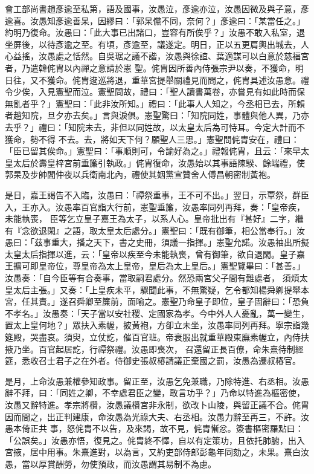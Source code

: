 \begin{pinyinscope}
 會工部尚書趙彥逾至私第，語及國事，汝愚泣，彥逾亦泣，汝愚因微及與子意，彥逾喜。汝愚知彥逾善杲，因繆曰：「郭杲儻不同，奈何？」彥逾曰：「某當任之。」約明乃復命。汝愚曰：「此大事已出諸口，豈容有所俟乎？」汝愚不敢入私室，退坐屏後，以待彥逾之至。有頃，彥逾至，議遂定。明日，正以五更肩輿出城去，人心益搖，汝愚處之恬然。自吳琚之議不諧，汝愚與徐誼、葉適謀可以白意於慈福宮者，乃遣韓侂胄以內禪之意請於憲
 聖。侂胄因所善內侍張宗尹以奏，不獲命，明日往，又不獲命。侂胄逡巡將退，重華宮提舉關禮見而問之，侂胄具述汝愚意。禮令少俟，入見憲聖而泣。憲聖問故，禮曰：「聖人讀書萬卷，亦嘗見有如此時而保無亂者乎？」憲聖曰：「此非汝所知。」禮曰：「此事人人知之，今丞相已去，所賴者趙知院，旦夕亦去矣。」言與淚俱。憲聖驚曰：「知院同姓，事體與他人異，乃亦去乎？」禮曰：「知院未去，非但以同姓故，以太皇太后為可恃耳。今定大計而不獲命，勢不得
 不去。去，將如天下何？願聖人三思。」憲聖問侂胄安在，禮曰：「臣已留其俟命。」憲聖曰：「事順則可，令諭好為之。」禮報侂胄，且云：「來早太皇太后於壽皇梓宮前垂簾引執政。」侂胄復命，汝愚始以其事語陳騤、餘端禮，使郭杲及步帥閻仲夜以兵衛南北內，禮使其姻黨宣贊舍人傅昌朝密制黃袍。



 是日，嘉王謁告不入臨，汝愚曰：「禫祭重事，王不可不出。」翌日，示覃祭，群臣入，王亦入。汝愚率百官詣大行前，憲聖垂簾，汝愚率同列再拜，奏：「皇帝疾，未能執喪，
 臣等乞立皇子嘉王為太子，以系人心。皇帝批出有『甚好』二字，繼有『念欲退閑』之語，取太皇太后處分。」憲聖曰：「既有御筆，相公當奉行。」汝愚曰：「茲事重大，播之天下，書之史冊，須議一指揮。」憲聖允諾。汝愚袖出所擬太皇太后指揮以進，云：「皇帝以疾至今未能執喪，曾有御筆，欲自退閑。皇子嘉王擴可即皇帝位，尊皇帝為太上皇帝，皇后為太上皇后。」憲聖覽畢曰：「甚善。」汝愚奏：「自今臣等有合奏事，當取嗣君處分。然恐兩宮父子間有難處者，
 須煩太皇太后主張。」又奏：「上皇疾未平，驟聞此事，不無驚疑，乞令都知楊舜卿提舉本宮，任其責。」遂召舜卿至簾前，面喻之。憲聖乃命皇子即位，皇子固辭曰：「恐負不孝名。」汝愚奏：「天子當以安社稷、定國家為孝。今中外人人憂亂，萬一變生，置太上皇何地？」眾扶入素幄，披黃袍，方卻立未坐，汝愚率同列再拜。寧宗詣幾筵殿，哭盡哀。須臾，立仗訖，催百官班。帝衰服出就重華殿東廡素幄立，內侍扶掖乃坐。百官起居訖，行禫祭禮。汝愚即喪次，
 召還留正長百僚，命朱熹待制經筵，悉收召士君子之在外者。侍御史張叔椿請議正棄國之罰，汝愚為遷叔椿官。



 是月，上命汝愚兼權參知政事。留正至，汝愚乞免兼職，乃除特進、右丞相。汝愚辭不拜，曰：「同姓之卿，不幸處君臣之變，敢言功乎？」乃命以特進為樞密使，汝愚又辭特進。孝宗將欑，汝愚議欑宮非永制，欲改卜山陵，與留正議不合。侂胄因而間之，出正判建康，命汝愚為光祿大夫、右丞相。汝愚力辭至再三，不許。汝愚本倚正共
 事，怒侂胄不以告，及來謁，故不見，侂胄慚忿。簽書樞密羅點曰：「公誤矣。」汝愚亦悟，復見之。侂胄終不懌，自以有定策功，且依托肺腑，出入宮掖，居中用事。朱熹進對，以為言，又約吏部侍郎彭龜年同劾之，未果。熹白汝愚，當以厚賞酬勞，勿使預政，而汝愚謂其易制不為慮。




\end{pinyinscope}
